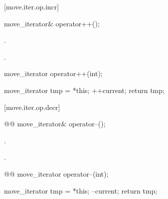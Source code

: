 [move.iter.op.incr]{}

%
%
\begin{itemdecl}
move_iterator& operator++();
\end{itemdecl}

\begin{itemdescr}
\pnum
\effects {}.

\pnum
\returns {}.
\end{itemdescr}

%
%
\begin{itemdecl}
move_iterator operator++(int);
\end{itemdecl}

\begin{itemdescr}
\pnum
\effects
\begin{codeblock}
move_iterator tmp = *this;
++current;
return tmp;
\end{codeblock}
\end{itemdescr}

[move.iter.op.decr]{}

%
%
\begin{itemdecl}
@@
  move_iterator& operator--();
\end{itemdecl}

\begin{itemdescr}
\pnum
\effects {}.

\pnum
\returns {}.
\end{itemdescr}

%
%
\begin{itemdecl}
@@
  move_iterator operator--(int);
\end{itemdecl}

\begin{itemdescr}
\pnum
\effects
\begin{codeblock}
move_iterator tmp = *this;
--current;
return tmp;
\end{codeblock}
\end{itemdescr}

